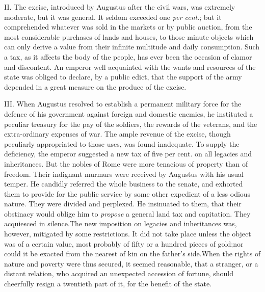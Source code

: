 
II. The excise, introduced by Augustus after the civil wars, was
extremely moderate, but it was general. It seldom exceeded one
\textit{per cent}.; but it comprehended whatever was sold in the markets
or by public auction, from the most considerable purchases of
lands and houses, to those minute objects which can only derive a
value from their infinite multitude and daily consumption. Such a
tax, as it affects the body of the people, has ever been the
occasion of clamor and discontent. An emperor well acquainted
with the wants and resources of the state was obliged to declare,
by a public edict, that the support of the army depended in a
great measure on the produce of the excise.\footnotemark[101]


III. When Augustus resolved to establish a permanent military
force for the defence of his government against foreign and
domestic enemies, he instituted a peculiar treasury for the pay
of the soldiers, the rewards of the veterans, and the
extra-ordinary expenses of war. The ample revenue of the excise,
though peculiarly appropriated to those uses, was found
inadequate. To supply the deficiency, the emperor suggested a new
tax of five per cent. on all legacies and inheritances. But the
nobles of Rome were more tenacious of property than of freedom.
Their indignant murmurs were received by Augustus with his usual
temper. He candidly referred the whole business to the senate,
and exhorted them to provide for the public service by some other
expedient of a less odious nature. They were divided and
perplexed. He insinuated to them, that their obstinacy would
oblige him to \textit{propose} a general land tax and capitation. They
acquiesced in silence.\footnotemark[102] The new imposition on legacies and
inheritances was, however, mitigated by some restrictions. It did
not take place unless the object was of a certain value, most
probably of fifty or a hundred pieces of gold;\footnotemark[103] nor could it
be exacted from the nearest of kin on the father’s side.\footnotemark[104] When
the rights of nature and poverty were thus secured, it seemed
reasonable, that a stranger, or a distant relation, who acquired
an unexpected accession of fortune, should cheerfully resign a
twentieth part of it, for the benefit of the state. \footnotemark[105]

